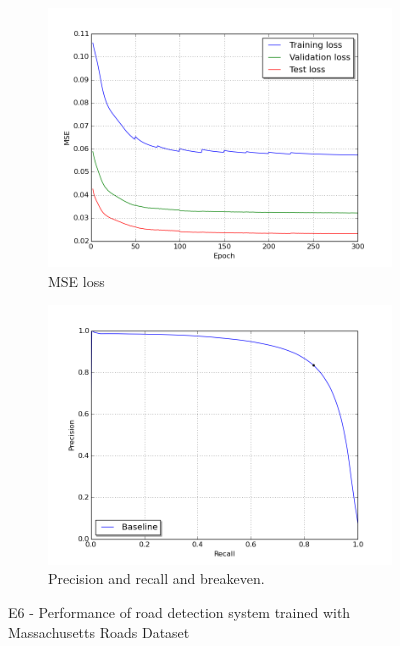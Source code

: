 \begin{figure}[!ht]
\begin{subfigure}{0.48\textwidth}
\includegraphics[width=\linewidth]{figs/E6/E6_lc_loss.png}
\caption{MSE loss} \label{fig:E6_performance_mass_lc}
\end{subfigure}
\hspace*{\fill} %
\begin{subfigure}{0.48\textwidth}
\includegraphics[width=\linewidth]{figs/E6/E6_pr.png}
\caption{Precision and recall and breakeven.} \label{fig:E6_performance_mass_pr}
\end{subfigure}
\hspace*{\fill} %
\caption{E6 - Performance of road detection system trained with Massachusetts Roads Dataset} \label{fig:E6_performance_mass}
\end{figure}

